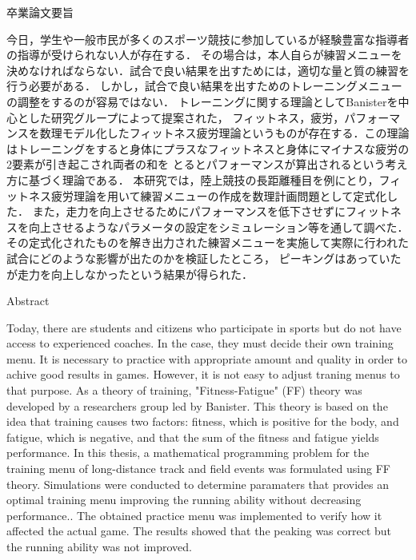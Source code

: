 \documentclass[12pt,fleqn]{jreport}
\begin{document}
\begin{center}
  {\huge 卒業論文要旨}
\end{center}
\vspace{3cm}
\large
今日，学生や一般市民が多くのスポーツ競技に参加しているが経験豊富な指導者の指導が受けられない人が存在する．
その場合は，本人自らが練習メニューを決めなければならない．試合で良い結果を出すためには，適切な量と質の練習を行う必要がある．
しかし，試合で良い結果を出すためのトレーニングメニューの調整をするのが容易ではない．
トレーニングに関する理論としてBanisterを中心とした研究グループによって提案された，
フィットネス，疲労，パフォーマンスを数理モデル化したフィットネス疲労理論というものが存在する．この理論
はトレーニングをすると身体にプラスなフィットネスと身体にマイナスな疲労の2要素が引き起こされ両者の和を
とるとパフォーマンスが算出されるという考え方に基づく理論である．
本研究では，陸上競技の長距離種目を例にとり，フィットネス疲労理論を用いて練習メニューの作成を数理計画問題として定式化した．
また，走力を向上させるためにパフォーマンスを低下させずにフィットネスを向上させるようなパラメータの設定をシミュレーション等を通して調べた．
その定式化されたものを解き出力された練習メニューを実施して実際に行われた試合にどのような影響が出たのかを検証したところ，
ピーキングはあっていたが走力を向上しなかったという結果が得られた．
\newpage
\thispagestyle{empty}

\begin{center}
  {\huge Abstract}
\end{center}
\vspace{3cm}
Today, there are students and citizens who participate in sports but do not have access to experienced coaches.
In the case, they must decide their own training menu.
It is necessary to practice with appropriate amount and quality in order to achive good results in games.
However, it is not easy to adjust traning menus to that purpose.
As a theory of training, "Fitness-Fatigue" (FF) theory was developed by a researchers group led by Banister.
This theory is based on the idea that training causes two factors: fitness, which is positive for the body, and fatigue, which is negative, and that the sum of the fitness and fatigue yields performance.
In this thesis, a mathematical programming problem for the training menu of long-distance track and field events was formulated using FF theory. Simulations were conducted to determine paramaters that provides an optimal training menu improving the running ability without decreasing performance..
The obtained practice menu was implemented to verify how it affected the actual game. The results showed that the peaking was correct but the running ability was not improved.
\end{document}

